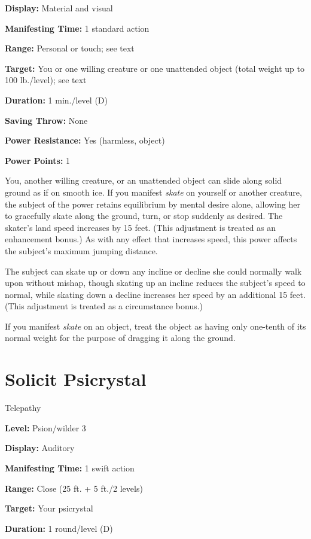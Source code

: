 \documentclass{article}
\begin{document}
\textbf{Display:} Material and visual

\textbf{Manifesting Time:} 1 standard action

\textbf{Range:} Personal or touch; see text

\textbf{Target:} You or one willing creature or one unattended object (total weight 
up to 100 lb./level); see text

\textbf{Duration:} 1 min./level (D)

\textbf{Saving Throw:} None

\textbf{Power Resistance:} Yes (harmless, object)

\textbf{Power Points:} 1

You, another willing creature, or an unattended object can slide along solid ground 
as if on smooth ice. If you manifest \textit{skate }on yourself or another creature, 
the subject of the power retains equilibrium by mental desire alone, allowing her 
to gracefully skate along the ground, turn, or stop suddenly as desired. The skater's 
land speed increases by 15 feet. (This adjustment is treated as an enhancement 
bonus.) As with any effect that increases speed, this power affects the subject's 
maximum jumping distance.

The subject can skate up or down any incline or decline she could normally walk 
upon without mishap, though skating up an incline reduces the subject's speed to 
normal, while skating down a decline increases her speed by an additional 15 feet. 
(This adjustment is treated as a circumstance bonus.)

If you manifest \textit{skate }on an object, treat the object as having only one-tenth 
of its normal weight for the purpose of dragging it along the ground.

\vspace{12pt}
\section*{Solicit Psicrystal}

Telepathy

\textbf{Level:} Psion/wilder 3

\textbf{Display:} Auditory

\textbf{Manifesting Time:} 1 swift action

\textbf{Range:} Close (25 ft. + 5 ft./2 levels)

\textbf{Target:} Your psicrystal

\textbf{Duration:} 1 round/level (D)
\end{document}
